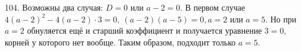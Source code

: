 104. Возможны два случая: $D=0$ или $a-2=0.$ В первом случае $4(a-2)^2-4(a-2)\cdot3=0,\ (a-2)(a-5)=0, a=2$ или $a=5.$ Но при $a=2$ обнуляется ещё и старший коэффициент и получается уравнение $3=0,$ корней у которого нет вообще. Таким образом, подходит только $a=5.$\\
